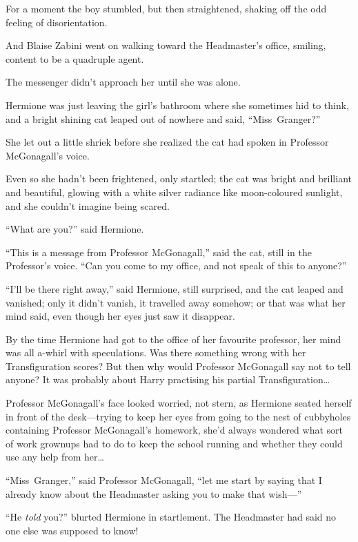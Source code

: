 For a moment the boy stumbled, but then straightened, shaking off the odd feeling of disorientation.

And Blaise Zabini went on walking toward the Headmaster’s office, smiling, content to be a quadruple agent.


The messenger didn’t approach her until she was alone.

Hermione was just leaving the girl’s bathroom where she sometimes hid to think, and a bright shining cat leaped out of nowhere and said, “Miss~Granger?”

She let out a little shriek before she realized the cat had spoken in Professor McGonagall’s voice.

Even so she hadn’t been frightened, only startled; the cat was bright and brilliant and beautiful, glowing with a white silver radiance like moon-coloured sunlight, and she couldn’t imagine being scared.

“What are you?” said Hermione.

“This is a message from Professor McGonagall,” said the cat, still in the Professor’s voice. “Can you come to my office, and not speak of this to anyone?”

“I’ll be there right away,” said Hermione, still surprised, and the cat leaped and vanished; only it didn’t vanish, it travelled away somehow; or that was what her mind said, even though her eyes just saw it disappear.

By the time Hermione had got to the office of her favourite professor, her mind was all a-whirl with speculations. Was there something wrong with her Transfiguration scores? But then why would Professor McGonagall say not to tell anyone? It was probably about Harry practising his partial Transfiguration…

Professor McGonagall’s face looked worried, not stern, as Hermione seated herself in front of the desk—trying to keep her eyes from going to the nest of cubbyholes containing Professor McGonagall’s homework, she’d always wondered what sort of work grownups had to do to keep the school running and whether they could use any help from her…

“Miss~Granger,” said Professor McGonagall, “let me start by saying that I already know about the Headmaster asking you to make that wish—”

“He \emph{told} you?” blurted Hermione in startlement. The Headmaster had said no one else was supposed to know!

